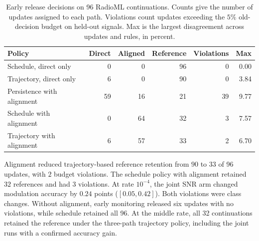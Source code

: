 \begin{table}[htbp]
\centering
\caption{Early release decisions on 96 RadioML continuations. Counts
give the number of updates assigned to each path. Violations count
updates exceeding the $5\%$ old-decision budget on held-out signals.
Max is the largest disagreement across updates and rules, in percent.}
\label{tab:rml_early_repair}
\begin{tabular}{lrrrrr}
\toprule
Policy & Direct & Aligned & Reference & Violations & Max \\
\midrule
Schedule, direct only & 0 & 0 & 96 & 0 & 0.00 \\
Trajectory, direct only & 6 & 0 & 90 & 0 & 3.84 \\
Persistence with alignment & 59 & 16 & 21 & 39 & 9.77 \\
Schedule with alignment & 0 & 64 & 32 & 3 & 7.57 \\
Trajectory with alignment & 6 & 57 & 33 & 2 & 6.70 \\
\bottomrule
\end{tabular}
\end{table}
Alignment reduced trajectory-based reference retention from $90$ to $33$ of 96 updates, with $2$ budget violations. The schedule policy with alignment retained $32$ references and had $3$ violations. At rate $10^{-4}$, the joint SNR arm changed modulation accuracy by $0.24$ points ($[0.05,0.42]$).
Both violations were class changes. Without alignment, early monitoring
released six updates with no violations, while schedule retained all 96.
At the middle rate, all 32 continuations retained the reference under
the three-path trajectory policy, including the joint runs with a
confirmed accuracy gain.
